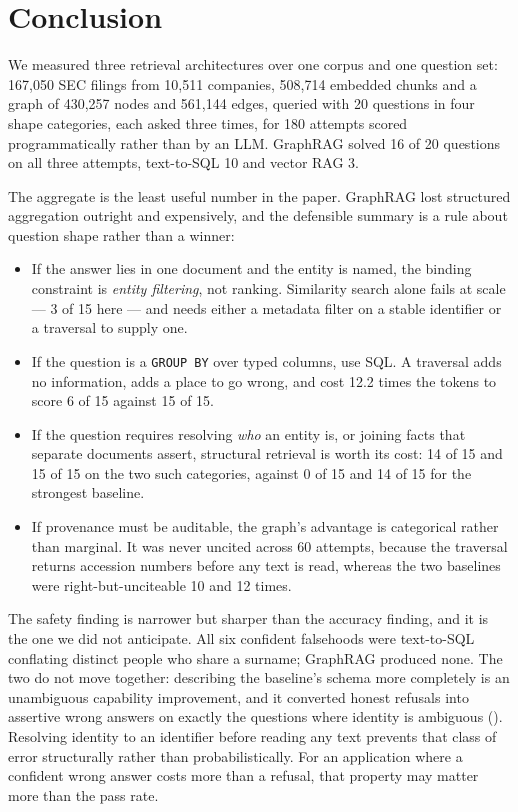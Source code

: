 \section{Conclusion}
\label{sec:conclusion}

We measured three retrieval architectures over one corpus and one question set:
167{,}050 SEC filings from 10{,}511 companies, 508{,}714 embedded chunks and a
graph of 430{,}257 nodes and 561{,}144 edges, queried with 20 questions in four
shape categories, each asked three times, for 180 attempts scored
programmatically rather than by an LLM. GraphRAG solved 16 of 20 questions on all
three attempts, text-to-SQL 10 and vector RAG 3.

The aggregate is the least useful number in the paper. GraphRAG lost structured
aggregation outright and expensively, and the defensible summary is a rule about
question shape rather than a winner:

\begin{itemize}
  \item If the answer lies in one document and the entity is named, the binding
        constraint is \emph{entity filtering}, not ranking. Similarity search
        alone fails at scale --- 3 of 15 here --- and needs either a metadata
        filter on a stable identifier or a traversal to supply one.
  \item If the question is a \texttt{GROUP BY} over typed columns, use SQL. A
        traversal adds no information, adds a place to go wrong, and cost 12.2
        times the tokens to score 6 of 15 against 15 of 15.
  \item If the question requires resolving \emph{who} an entity is, or joining
        facts that separate documents assert, structural retrieval is worth its
        cost: 14 of 15 and 15 of 15 on the two such categories, against 0 of 15
        and 14 of 15 for the strongest baseline.
  \item If provenance must be auditable, the graph's advantage is categorical
        rather than marginal. It was never uncited across 60 attempts, because
        the traversal returns accession numbers before any text is read, whereas
        the two baselines were right-but-unciteable 10 and 12 times.
\end{itemize}

The safety finding is narrower but sharper than the accuracy finding, and it is
the one we did not anticipate. All six confident falsehoods were text-to-SQL
conflating distinct people who share a surname; GraphRAG produced none. The two
do not move together: describing the baseline's schema more completely is an
unambiguous capability improvement, and it converted honest refusals into
assertive wrong answers on exactly the questions where identity is ambiguous
(). Resolving identity to an identifier before reading any
text prevents that class of error structurally rather than probabilistically. For an
application where a confident wrong answer costs more than a refusal, that
property may matter more than the pass rate.

